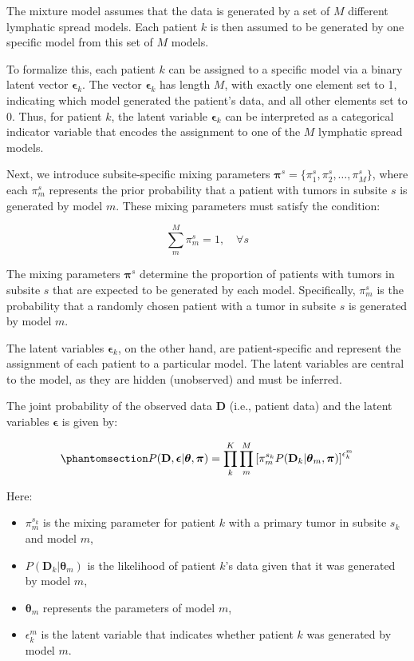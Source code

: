 \documentclass[
  sn-mathphys-num,
]{sn-jnl}
\providecommand{\tightlist}{%
  \setlength{\itemsep}{0pt}\setlength{\parskip}{0pt}}\usepackage{longtable,booktabs,array}
\begin{document}
The mixture model assumes that the data is generated by a set of \(M\)
different lymphatic spread models. Each patient \(k\) is then assumed to
be generated by one specific model from this set of \(M\) models.

To formalize this, each patient \(k\) can be assigned to a specific
model via a binary latent vector \(\boldsymbol{\epsilon}_k\). The vector
\(\boldsymbol{\epsilon}_k\) has length \(M\), with exactly one element
set to 1, indicating which model generated the patient's data, and all
other elements set to 0. Thus, for patient \(k\), the latent variable
\(\boldsymbol{\epsilon}_k\) can be interpreted as a categorical
indicator variable that encodes the assignment to one of the \(M\)
lymphatic spread models.

Next, we introduce subsite-specific mixing parameters
\(\boldsymbol{\pi}^s = \{\pi_1^s, \pi_2^s, \dots, \pi_M^s\}\), where
each \(\pi_m^s\) represents the prior probability that a patient with
tumors in subsite \(s\) is generated by model \(m\). These mixing
parameters must satisfy the condition:

\[
\sum_{m}^M \pi_m^s = 1, \quad \forall s
\]

The mixing parameters \(\boldsymbol{\pi}^s\) determine the proportion of
patients with tumors in subsite \(s\) that are expected to be generated
by each model. Specifically, \(\pi_m^s\) is the probability that a
randomly chosen patient with a tumor in subsite \(s\) is generated by
model \(m\).

The latent variables \(\boldsymbol{\epsilon}_{k}\), on the other hand,
are patient-specific and represent the assignment of each patient to a
particular model. The latent variables are central to the model, as they
are hidden (unobserved) and must be inferred.

The joint probability of the observed data \(\mathbf{D}\) (i.e., patient
data) and the latent variables \(\boldsymbol{\epsilon}\) is given by:

\begin{equation}\phantomsection\label{eq-complete-likelihood}{
P(\mathbf{D}, \boldsymbol{\epsilon} | \boldsymbol{\theta}, \boldsymbol{\pi}) = \prod_{k}^{K} \prod_{m}^{M} \left[ \pi_m^{s_k} P(\mathbf{D}_k | \boldsymbol{\theta}_m, \boldsymbol{\pi}) \right]^{\epsilon_{k}^m}
}\end{equation}

Here:

\begin{itemize}
\tightlist
\item
  \(\pi_m^{s_k}\) is the mixing parameter for patient \(k\) with a
  primary tumor in subsite \(s_k\) and model \(m\),
\item
  \(P(\mathbf{D}_k | \boldsymbol{\theta}_m)\) is the likelihood of
  patient \(k\)'s data given that it was generated by model \(m\),
\item
  \(\boldsymbol{\theta}_m\) represents the parameters of model \(m\),
\item
  \(\epsilon_{k}^m\) is the latent variable that indicates whether
  patient \(k\) was generated by model \(m\).
\end{itemize}
\end{document}
